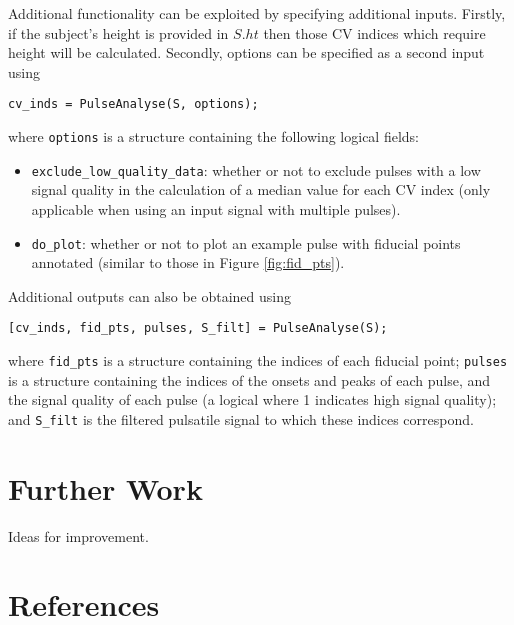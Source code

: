 \documentclass[12pt]{iopart}
\newcommand{\us}{\texttt{\_}}
\begin{document}
Additional functionality can be exploited by specifying additional inputs. Firstly, if the subject's height is provided in $S.ht$ then those CV indices which require height will be calculated. Secondly, options can be specified as a second input using
\begin{center}
	\texttt{cv\us inds = PulseAnalyse(S, options);}
\end{center}
where \texttt{options} is a structure containing the following logical fields:
\begin{itemize}
	\item \texttt{exclude\us low\us quality\us data}: whether or not to exclude pulses with a low signal quality in the calculation of a median value for each CV index (only applicable when using an input signal with multiple pulses).
	\item \texttt{do\us plot}: whether or not to plot an example pulse with fiducial points annotated (similar to those in Figure \ref{fig:fid_pts}).
\end{itemize}

Additional outputs can also be obtained using
\begin{center}
	\texttt{[cv\us inds, fid\us pts, pulses, S\us filt] = PulseAnalyse(S);}
\end{center}
where \texttt{fid\us pts} is a structure containing the indices of each fiducial point; \texttt{pulses} is a structure containing the indices of the onsets and peaks of each pulse, and the signal quality of each pulse (a logical where 1 indicates high signal quality); and \texttt{S\us filt} is the filtered pulsatile signal to which these indices correspond.

\section{Further Work}
\label{sec:further_work}

Ideas for improvement.

\newpage


\section*{References}




\end{document}
